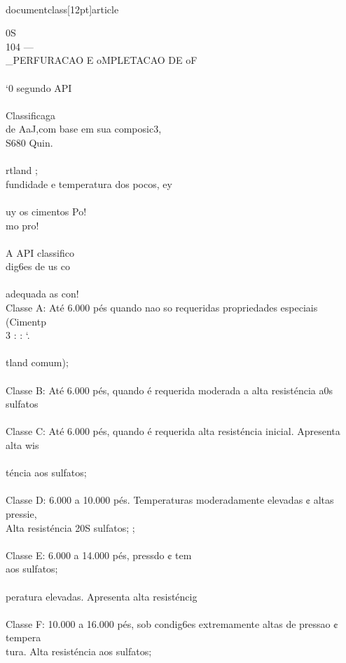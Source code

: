 \\documentclass[12pt]{article}
\begin{document}
0S\\
104 —\\_PERFURACAO E oMPLETACAO DE oF\\
\\
‘0 segundo API\\
\\
Classificaga\\
de AaJ,com base em sua composic3,\\
S680 Quin.\\
\\
rtland ;\\
fundidade e temperatura dos pocos, ey\\
\\
uy os cimentos Po!\\
mo pro!\\
\\
A API classifico\\
dig6es de us co\\
\\
adequada as con!\\
Classe A: Até 6.000 pés quando nao so requeridas propriedades especiais (Cimentp\\
3 : : ‘.\\
\\
tland comum);\\
\\
Classe B: Até 6.000 pés, quando é requerida moderada a alta resisténcia a0s sulfatos\\
\\
Classe C: Até 6.000 pés, quando é requerida alta resisténcia inicial. Apresenta alta wis\\
\\
téncia aos sulfatos;\\
\\
Classe D: 6.000 a 10.000 pés. Temperaturas moderadamente elevadas ¢ altas pressie,\\
Alta resisténcia 20S sulfatos; ;\\
\\
Classe E: 6.000 a 14.000 pés, pressdo ¢ tem\\
aos sulfatos;\\
\\
peratura elevadas. Apresenta alta resisténcig\\
\\
Classe F: 10.000 a 16.000 pés, sob condig6es extremamente altas de pressao ¢ tempera\\
tura. Alta resisténcia aos sulfatos;\\
\end{document}
